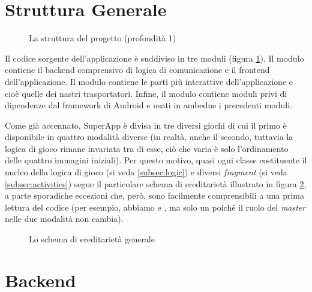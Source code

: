 \section{Struttura Generale}


\begin{figure}[h!]
\caption{La struttura del progetto (profondità 1)}
\label{fig:tree_root}
\end{figure}

Il codice sorgente dell'applicazione è suddiviso in tre moduli (figura \ref{fig:tree_root}). Il modulo  contiene il backend comprensivo di logica di comunicazione e il frontend dell'applicazione. Il modulo  contiene le parti più interattive dell'applicazione e cioè quelle dei nastri trasportatori. Infine, il modulo  contiene moduli privi di dipendenze dal framework di Android e usati in ambedue i precedenti moduli.

Come già accennato, SuperApp è divisa in tre diversi giochi di cui il primo è disponibile in quattro modalità diverse (in realtà, anche il secondo, tuttavia la logica di gioco rimane invariata tra di esse, ciò che varia è solo l'ordinamento delle quattro immagini iniziali). Per questo motivo, quasi ogni classe costituente il nucleo della logica di gioco (si veda \ref{subsec:logic}) e diversi \textit{fragment} (si veda \ref{subsec:activities}) segue il particolare schema di ereditarietà illustrato in figura \ref{fig:hierarchy}, a parte sporadiche eccezioni che, però, sono facilmente comprensibili a una prima lettura del codice (per esempio, abbiamo  e , ma solo un  poiché il ruolo del \textit{master} nelle due modalità non cambia).

\begin{figure}[h!]
\caption{Lo schema di ereditarietà generale}
\label{fig:hierarchy}
\end{figure}

\section{Backend}

